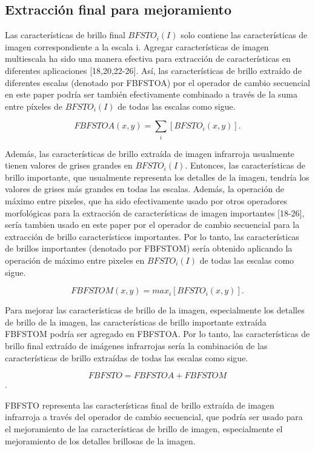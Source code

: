 \documentclass[a4paper, 11 pt, conference]{ieeeconf}      %
\begin{document}
\subsection{Extracci\'on final para mejoramiento}

Las caracter\'isticas de brillo final $BFSTO_i(I)$ solo contiene las caracter\'isticas de imagen correspondiente a la escala i. Agregar  caracter\'isticas de imagen multiescala ha sido una manera efectiva para extracci\'on de caracter\'isticas en diferentes aplicaciones [18,20,22-26]. As\'i, las caracter\'isticas de brillo extra\'ido de diferentes escalas (denotado por FBFSTOA) por el operador de cambio secuencial en este paper podr\'ia ser tambi\'en efectivamente combinado a trav\'es de la suma entre p\'ixeles de $BFSTO_i(I)$ de todas las escalas como sigue.

$$
FBFSTOA(x,y) = \sum_{i} [BFSTO_i(x,y)].
$$

Adem\'as, las caracter\'isticas de brillo extra\'ida de imagen infrarroja usualmente tienen valores de grises grandes en $BFSTO_i(I)$. Entonces, las caracter\'isticas de brillo importante, que usualmente representa los detalles de la imagen, tendr\'ia los valores de grises m\'as grandes en todas las escalas. Adem\'as, la operaci\'on de m\'aximo entre pixeles, que ha sido efectivamente usado por otros operadores morfol\'ogicas para la extracci\'on de caracter\'isticas de imagen importantes [18-26], ser\'ia tambien usado en este paper por el operador de cambio secuencial para la extracci\'on de brillo caracter\'isticos importantes. Por lo tanto, las caracter\'isticas de brillos importantes (denotado por FBFSTOM) ser\'ia obtenido aplicando la operaci\'on de m\'aximo entre pixeles en $BFSTO_i(I)$ de todas las escalas como sigue.

$$
FBFSTOM(x,y) = max_i[BFSTO_i(x,y)].
$$

Para mejorar las caracter\'isticas de brillo de la imagen, especialmente los detalles de brillo de la imagen, las caracter\'isticas de brillo importante extra\'ida FBFSTOM podr\'ia ser agregado en FBFSTOA. Por lo tanto, las caracter\'isticas de brillo final extra\'ido de im\'agenes infrarrojas ser\'ia la combinaci\'on de las caracter\'isticas de brillo extra\'idas de todas las escalas como sigue.

$$FBFSTO = FBFSTOA + FBFSTOM$$.

FBFSTO representa las caracter\'isticas final de brillo extra\'ida de imagen infrarroja a trav\'es del operador de cambio secuencial, que podr\'ia ser usado para el mejoramiento de las caracter\'isticas de brillo de imagen, especialmente el mejoramiento de los detalles brillosas de la imagen.
\end{document}
